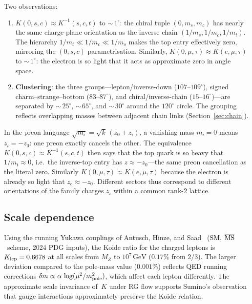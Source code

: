 \documentclass[12pt,a4paper]{article}
\newcommand{\GeV}{\,\mathrm{GeV}}
\begin{document}
\noindent Two observations:
\begin{enumerate}
\item \textbf{$K(0,s,c) \approx K^{-1}(s,c,t)$} to ${\sim}\,1^\circ$:
  the chiral tuple $(0, m_s, m_c)$ has nearly the same charge-plane
  orientation as the inverse chain $(1/m_s, 1/m_c, 1/m_t)$. The
  hierarchy $1/m_t \ll 1/m_c \ll 1/m_s$ makes the top entry
  effectively zero, mirroring the $(0, s, c)$ parametrisation.
  Similarly, $K(0,\mu,\tau) \approx K(e,\mu,\tau)$ to ${\sim}\,1^\circ$:
  the electron is so light that it acts as approximate zero in angle space.

\item \textbf{Clustering}: the three groups---lepton/inverse-down
  ($107$--$109^\circ$), signed charm--strange--bottom
  ($83$--$87^\circ$), and chiral/inverse-chain
  ($15$--$16^\circ$)---are separated by ${\sim}\,25^\circ$,
  ${\sim}\,65^\circ$, and ${\sim}\,30^\circ$ around the
  $120^\circ$ circle. The grouping reflects overlapping masses
  between adjacent chain links (Section~\ref{sec:chain}).
\end{enumerate}

\noindent In the preon language $\sqrt{m_i} = \sqrt{k}\,(z_0 + z_i)$,
a vanishing mass $m_i = 0$ means $z_i = -z_0$: one preon exactly
cancels the other. The equivalence $K(0,s,c) \approx K^{-1}(s,c,t)$
then says that the top quark is so heavy that $1/m_t \approx 0$,
i.e.\ the inverse-top entry has $z \approx -z_0$---the same preon
cancellation as the literal zero. Similarly
$K(0,\mu,\tau) \approx K(e,\mu,\tau)$ because the electron is already
so light that $z_e \approx -z_0$. Different sectors thus correspond
to different orientations of the family charges $z_i$ within a
common rank-2 lattice.

\subsection{Scale dependence}
\label{sec:running}

Using the running Yukawa couplings of Antusch, Hinze, and
Saad~\cite{AntuschHinzeSaad:2025} (SM, $\overline{\rm MS}$~scheme,
2024 PDG inputs), the Koide ratio for the charged leptons is
$K_{\rm lep} = 0.6678$ at all scales from $M_Z$ to $10^7\GeV$
($0.17\%$ from $2/3$). The larger deviation compared to the pole-mass
value ($0.001\%$) reflects QED running corrections
$\delta m \propto \alpha\,\log(\mu^2/m_{\rm pole}^2)$, which affect
each lepton differently. The approximate scale invariance of~$K$ under
RG flow supports Sumino's
observation~\cite{Sumino:2009} that gauge interactions
approximately preserve the Koide relation.
\end{document}
